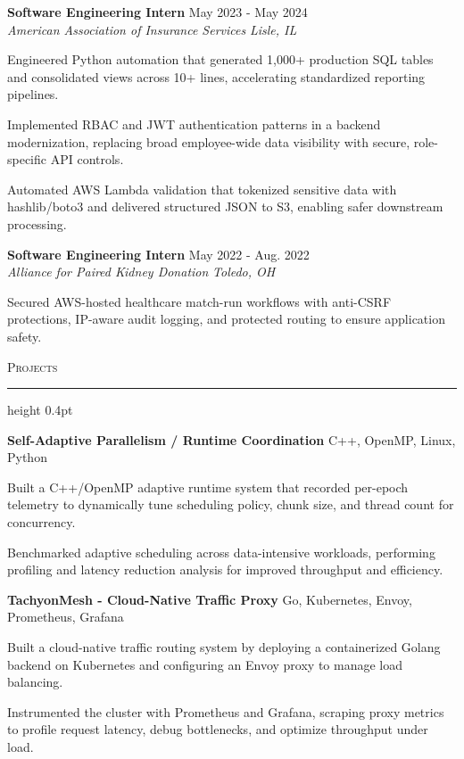 \documentclass[letterpaper,11pt]{article}
\newcommand{\resumesection}[1]{%
  \par\vspace{2pt}%
  {\large\scshape #1}\par\vspace{2pt}%
  \hrule height 0.4pt\vspace{2pt}%
}
\newcommand{\resumeSubheading}[4]{
  \textbf{#1} \hfill #2\\
  \textit{#3} \hfill \textit{#4}
}
\newcommand{\projectHeading}[2]{
  \textbf{#1} \hfill #2
}
\begin{document}
\resumeSubheading
{Software Engineering Intern}{May 2023 - May 2024}
{American Association of Insurance Services}{Lisle, IL}
\begin{tightitemize}
  \item Engineered Python automation that generated 1,000+ production SQL tables and consolidated views across 10+ lines, accelerating standardized reporting pipelines.
  \item Implemented RBAC and JWT authentication patterns in a backend modernization, replacing broad employee-wide data visibility with secure, role-specific API controls.
  \item Automated AWS Lambda validation that tokenized sensitive data with hashlib/boto3 and delivered structured JSON to S3, enabling safer downstream processing.
\end{tightitemize}

\resumeSubheading
{Software Engineering Intern}{May 2022 - Aug. 2022}
{Alliance for Paired Kidney Donation}{Toledo, OH}
\begin{tightitemize}
  \item Secured AWS-hosted healthcare match-run workflows with anti-CSRF protections, IP-aware audit logging, and protected routing to ensure application safety.
\end{tightitemize}

\resumesection{Projects}
\projectHeading{Self-Adaptive Parallelism / Runtime Coordination}{C++, OpenMP, Linux, Python}
\begin{tightitemize}
  \item Built a C++/OpenMP adaptive runtime system that recorded per-epoch telemetry to dynamically tune scheduling policy, chunk size, and thread count for concurrency.
  \item Benchmarked adaptive scheduling across data-intensive workloads, performing profiling and latency reduction analysis for improved throughput and efficiency.
\end{tightitemize}

\projectHeading{TachyonMesh - Cloud-Native Traffic Proxy}{Go, Kubernetes, Envoy, Prometheus, Grafana}
\begin{tightitemize}
  \item Built a cloud-native traffic routing system by deploying a containerized Golang backend on Kubernetes and configuring an Envoy proxy to manage load balancing.
  \item Instrumented the cluster with Prometheus and Grafana, scraping proxy metrics to profile request latency, debug bottlenecks, and optimize throughput under load.
\end{tightitemize}
\end{document}
